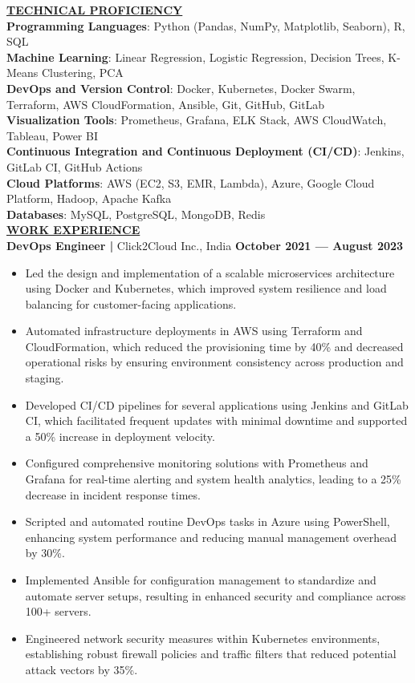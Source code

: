 \documentclass{article}
\begin{document}
\noindent \textbf{\underline{TECHNICAL PROFICIENCY}} \\
\textbf{Programming Languages}{: \small Python (Pandas, NumPy, Matplotlib, Seaborn), R, SQL} \\
\textbf{Machine Learning}{: \small Linear Regression, Logistic Regression, Decision Trees, K-Means Clustering, PCA} \\
\textbf{DevOps and Version Control}{: \small Docker, Kubernetes, Docker Swarm, Terraform, AWS CloudFormation, Ansible, Git, GitHub, GitLab} \\
\textbf{Visualization Tools}{: \small Prometheus, Grafana, ELK Stack, AWS CloudWatch, Tableau, Power BI} \\
\textbf{Continuous Integration and Continuous Deployment (CI/CD)}{: \small Jenkins, GitLab CI, GitHub Actions} \\
\textbf{Cloud Platforms}{: \small AWS (EC2, S3, EMR, Lambda), Azure, Google Cloud Platform, Hadoop, Apache Kafka} \\
\textbf{Databases}{: \small MySQL, PostgreSQL, MongoDB, Redis} \\

\noindent \textbf{\underline{WORK EXPERIENCE}} \\
\noindent \textbf{DevOps Engineer | } Click2Cloud Inc., India  \hfill \textbf{October 2021 — August 2023}
\begin{itemize}[noitemsep,nolistsep,leftmargin=*]
\item {\small Led the design and implementation of a scalable microservices architecture using Docker and Kubernetes, which improved system resilience and load balancing for customer-facing applications.}
\item {\small Automated infrastructure deployments in AWS using Terraform and CloudFormation, which reduced the provisioning time by 40\% and decreased operational risks by ensuring environment consistency across production and staging.}
\item {\small Developed CI/CD pipelines for several applications using Jenkins and GitLab CI, which facilitated frequent updates with minimal downtime and supported a 50\% increase in deployment velocity.}
\item {\small Configured comprehensive monitoring solutions with Prometheus and Grafana for real-time alerting and system health analytics, leading to a 25\% decrease in incident response times.}
\item {\small Scripted and automated routine DevOps tasks in Azure using PowerShell, enhancing system performance and reducing manual management overhead by 30\%.}
\item {\small Implemented Ansible for configuration management to standardize and automate server setups, resulting in enhanced security and compliance across 100+ servers.}
\item {\small Engineered network security measures within Kubernetes environments, establishing robust firewall policies and traffic filters that reduced potential attack vectors by 35\%.}
\end{itemize}
\end{document}
